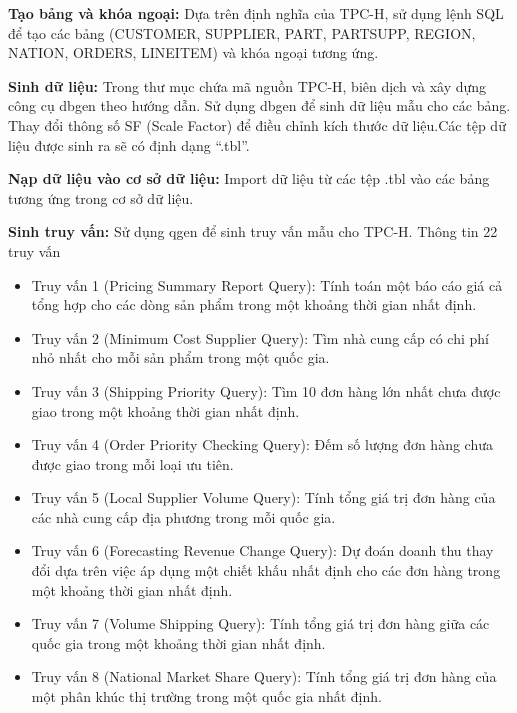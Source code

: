 \documentclass{article}[14pt]
\begin{document}
{\textbf{Tạo bảng và khóa ngoại: }Dựa trên định nghĩa của TPC-H, sử dụng lệnh SQL để tạo các bảng (CUSTOMER, SUPPLIER, PART, PARTSUPP, REGION, NATION, ORDERS, LINEITEM)  và khóa ngoại tương ứng.

\textbf{Sinh dữ liệu: }Trong thư mục chứa mã nguồn TPC-H, biên dịch và xây dựng công cụ dbgen theo hướng dẫn. Sử dụng dbgen để sinh dữ liệu mẫu cho các bảng. Thay đổi thông số SF (Scale Factor) để điều chỉnh kích thước dữ liệu.Các tệp dữ liệu được sinh ra sẽ có định dạng “.tbl”.

\textbf{Nạp dữ liệu vào cơ sở dữ liệu: }Import dữ liệu từ các tệp .tbl vào các bảng tương ứng trong cơ sở dữ liệu. 

\textbf{Sinh truy vấn:} Sử dụng qgen để sinh truy vấn mẫu cho TPC-H. Thông tin 22 truy vấn 

\begin{itemize}
\item Truy vấn 1 (Pricing Summary Report Query): Tính toán một báo cáo giá cả tổng hợp cho các dòng sản phẩm trong một khoảng thời gian nhất định.
\item Truy vấn 2 (Minimum Cost Supplier Query): Tìm nhà cung cấp có chi phí nhỏ nhất cho mỗi sản phẩm trong một quốc gia.
\item Truy vấn 3 (Shipping Priority Query): Tìm 10 đơn hàng lớn nhất chưa được giao trong một khoảng thời gian nhất định.
\item Truy vấn 4 (Order Priority Checking Query): Đếm số lượng đơn hàng chưa được giao trong mỗi loại ưu tiên.
\item Truy vấn 5 (Local Supplier Volume Query): Tính tổng giá trị đơn hàng của các nhà cung cấp địa phương trong mỗi quốc gia.
\item Truy vấn 6 (Forecasting Revenue Change Query): Dự đoán doanh thu thay đổi dựa trên việc áp dụng một chiết khấu nhất định cho các đơn hàng trong một khoảng thời gian nhất định.
\item Truy vấn 7 (Volume Shipping Query): Tính tổng giá trị đơn hàng giữa các quốc gia trong một khoảng thời gian nhất định.
\item Truy vấn 8 (National Market Share Query): Tính tổng giá trị đơn hàng của một phân khúc thị trường trong một quốc gia nhất định.


\end{itemize}}
\end{document}
